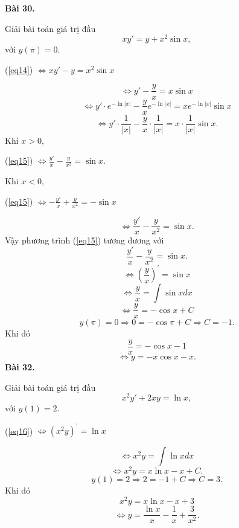 \documentclass[12pt,a4paper]{article}
\begin{document}
\textbf{Bài 30.}
\begin{mybox}
Giải bài toán giá trị đầu
\begin{equation}
xy' = y + {x^2}\sin x,
\label{eq14}
\end{equation}
với \(y\left( \pi  \right) = 0.\)
\end{mybox}
\begin{center}
(\ref{eq14}) \( \Leftrightarrow xy' - y = {x^2}\sin x\)
\end{center}
\[ \Leftrightarrow y' - \frac{y}{x} = x\sin x\]
\[ \Leftrightarrow y' \cdot {e^{ - \ln \left| x \right|}} - \frac{y}{x}{e^{ - \ln \left| x \right|}} = x{e^{ - \ln \left| x \right|}}\sin x\]
\begin{equation}
 \label{eq15}
 \Leftrightarrow y' \cdot \frac{1}{{\left| x \right|}} - \frac{y}{x} \cdot \frac{1}{{\left| x \right|}} = x \cdot \frac{1}{{\left| x \right|}}\sin x.
\end{equation}
Khi \(x > 0,\) 
\begin{center}
(\ref{eq15}) \( \Leftrightarrow \frac{{y'}}{x} - \frac{y}{{{x^2}}} = \sin x.\)
\end{center}
Khi \(x < 0,\)
\begin{center}
(\ref{eq15}) \( \Leftrightarrow  - \frac{{y'}}{x} + \frac{y}{{{x^2}}} =  - \sin x\)
\end{center}
\[ \Leftrightarrow \frac{{y'}}{x} - \frac{y}{{{x^2}}} = \sin x.\]
Vậy phương trình (\ref{eq15}) tương đương với
\[\frac{{y'}}{x} - \frac{y}{{{x^2}}} = \sin x.\]
\[ \Leftrightarrow {\left( {\frac{y}{x}} \right)^\prime } = \sin x\]
\[ \Leftrightarrow \frac{y}{x} = \int {\sin xdx} \]
\[ \Leftrightarrow \frac{y}{x} =  - \cos x + C\]
\[y\left( \pi  \right) = 0 \Rightarrow 0 =  - \cos \pi  + C \Rightarrow C =  - 1.\]
Khi đó
\[\frac{y}{x} =  - \cos x - 1\]
\[ \Leftrightarrow y =  - x\cos x - x.\]
\textbf{Bài 32.}
\begin{mybox}
Giải bài toán giá trị đầu
\begin{equation}
{x^2}y' + 2xy = \ln x,
\label{eq16}
\end{equation}
với \(y\left( 1 \right) = 2.\)
\end{mybox}
\begin{center}
(\ref{eq16}) \( \Leftrightarrow {\left( {{x^2}y} \right)^\prime } = \ln x\)
\end{center}
\[ \Leftrightarrow {x^2}y = \int {\ln xdx} \]
\[ \Leftrightarrow {x^2}y = x\ln x - x + C.\]
\[y\left( 1 \right) = 2 \Rightarrow 2 =  - 1 + C \Rightarrow C = 3.\]
Khi đó
\[{x^2}y = x\ln x - x + 3\]
\[ \Leftrightarrow y = \frac{{\ln x}}{x} - \frac{1}{x} + \frac{3}{{{x^2}}}.\]
\end{document}
